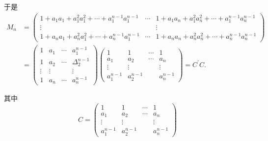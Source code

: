 \documentclass{article}
\begin{document}
于是
\begin{equation*}
    \begin{aligned}
        M_{n} & =\left(\begin{array}{ccc}
                1+a_{1} a_{1}+a_{1}^{2} a_{1}^{2}+\cdots+a_{1}^{n-1} a_{1}^{n-1} & \cdots & 1+a_{1} a_{n}+a_{1}^{2} a_{n}^{2}+\cdots+a_{1}^{n-1} a_{n}^{n-1} \\
                \vdots                                                           &        & \vdots                                                           \\
                1+a_{n} a_{1}+a_{n}^{2} a_{1}^{2}+\cdots+a_{n}^{n-1} a_{1}^{n-1} & \cdots & 1+a_{n} a_{n}+a_{n}^{2} a_{n}^{2}+\cdots+a_{n}^{n-1} a_{n}^{n-1}
            \end{array}\right)                                                        \\
              & =\left(\begin{array}{cccc}
                1      & a_{1}  & \cdots & a_{1}^{n-1}      \\
                1      & a_{2}  & \cdots & \Delta_{2}^{n-1} \\
                \vdots & \vdots &        & \vdots           \\
                1      & a_{n}  & \cdots & a_{n}^{n-1}
            \end{array}\right)\left(\begin{array}{cccc}
                1           & 1           & \cdots & 1           \\
                a_{1}       & a_{2}       & \cdots & a_{n}       \\
                \vdots      & \vdots      &        & \vdots      \\
                a_{1}^{n-1} & a_{2}^{n-1} &        & a_{n}^{n-1}
            \end{array}\right)=C^{\prime} C .
    \end{aligned}
\end{equation*}

其中
$$
    C=\left(\begin{array}{cccc}
            1           & 1           & \cdots & 1           \\
            a_{1}       & a_{2}       & \cdots & a_{n}       \\
            \vdots      & \vdots      &        & \vdots      \\
            a_{1}^{n-1} & a_{2}^{n-1} &        & a_{n}^{n-1}
        \end{array}\right)
$$
\end{document}
